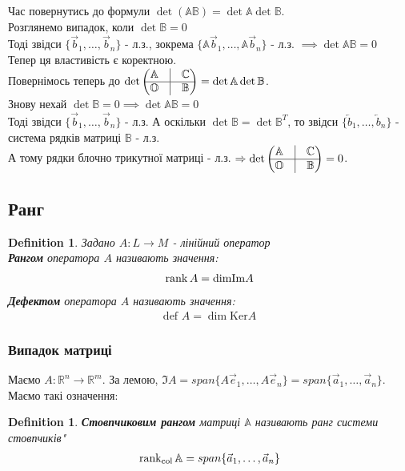\documentclass[a4paper, 10pt]{article}
\def\ker#1{\textrm{Ker} {#1}}
\theoremstyle{theoremdd}
\theoremstyle{theoremdd}
\newtheorem{definition}[theorem]{Definition}
\theoremstyle{theoremdd}
\theoremstyle{theoremdd}
\theoremstyle{theoremdd}
\theoremstyle{theoremdd}
\theoremstyle{theoremdd}
\theoremstyle{theoremdd}
\begin{document}
Час повернутись до формули $\det (\mathbb{A} \mathbb{B}) = \det \mathbb{A} \det \mathbb{B}$.\\
Розглянемо випадок, коли $\det \mathbb{B} = 0$\\
Тоді звідси $\{\vec{b}_1, \dots, \vec{b}_n\}$ - л.з., зокрема $\{\mathbb{A}\vec{b}_1, \dots, \mathbb{A} \vec{b}_n\}$ - л.з. $\implies \det \mathbb{A} \mathbb{B} = 0$\\
Тепер ця властивість є коректною.
\bigskip \\
Повернімось теперь до $\det \begin{pmatrix}
 \mathbb{A} & \vline & \mathbb{C} \\
 \hline
 \mathbb{O} & \vline & \mathbb{B}
\end{pmatrix} = \det \mathbb{A} \det \mathbb{B}$.\\
Знову нехай $\det \mathbb{B} = 0 \implies \det \mathbb{A} \mathbb{B} = 0$\\
Тоді звідси $\{ \vec{b}_1,\dots,\vec{b}_n \}$ - л.з. А оскільки $\det \mathbb{B} = \det \mathbb{B}^T$, то звідси $\{ \overleftarrow{b}_1,\dots,\overleftarrow{b}_n \}$ - система рядків матриці $\mathbb{B}$ - л.з.\\
А тому рядки блочно трикутної матриці - л.з. $\Rightarrow \det \begin{pmatrix}
 \mathbb{A} & \vline & \mathbb{C} \\
 \hline
 \mathbb{O} & \vline & \mathbb{B}
\end{pmatrix} = 0$.

\subsection{Ранг}
\begin{definition}
Задано $A: L \to M$ - лінійний оператор\\
\textbf{Рангом} оператора $A$ називають значення: 
\begin{align*}
\rank A = \textrm{dim} {\Im} A
\end{align*}
\textbf{Дефектом} оператора $A$ називають значення:
\begin{align*}
\textrm{def } A = \dim{\ker A}
\end{align*}
\end{definition}

\subsubsection*{Випадок матриці}
Маємо $A: \mathbb{R}^n \to \mathbb{R}^m$. За лемою, $\Im A = span\{A\vec{e}_1,\dots, A\vec{e}_n\} = span\{\vec{a}_1,\dots,\vec{a}_n\}$. Маємо такі означення:
\begin{definition}
\textbf{Стовпчиковим рангом} матриці $\mathbb{A}$ називають ранг системи стовпчиків"
\begin{align*}
\rank_{\textrm{col}} \mathbb{A} = span\{\vec{a}_1,\dots,\vec{a}_n\}
\end{align*}
\end{definition}
\end{document}
